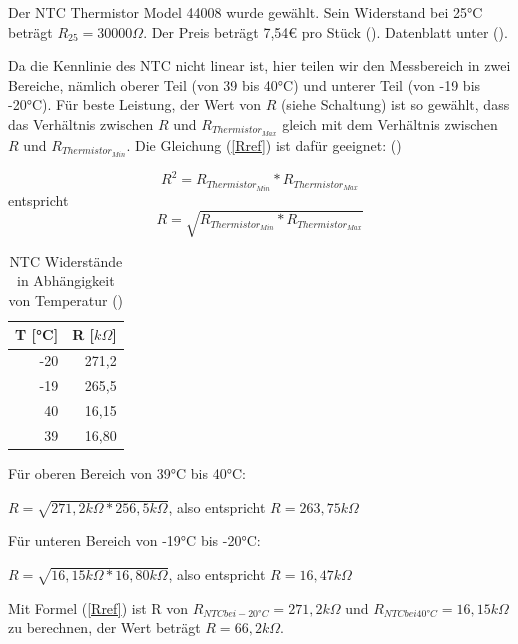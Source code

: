 \documentclass[12pt]{article}
\begin{document}
Der NTC Thermistor Model 44008 wurde gewählt. Sein Widerstand bei 25°C beträgt $R_{25} = 30000\Omega$. Der Preis beträgt 7,54€ pro Stück (\cite{TEConnectivity.2021c}). Datenblatt unter (\cite{TEConnectivity.2016}).

Da die Kennlinie des NTC nicht linear ist, hier teilen wir den Messbereich in zwei Bereiche, nämlich oberer Teil (von 39 bis 40°C) und unterer Teil (von -19 bis -20°C). Für beste Leistung, der Wert von $R$ (siehe Schaltung) ist so gewählt, dass das Verhältnis zwischen $R$ und $R_{Thermistor_{Max}}$ gleich mit dem Verhältnis zwischen $R$ und $R_{Thermistor_{Min}}$. Die Gleichung (\ref{Rref}) ist dafür geeignet: (\cite{TexasInstruments.2018})

\begin{equation}
  R^2 = R_{Thermistor_{Min}} * R_{Thermistor_{Max}}
\end{equation}
entspricht
\begin{equation}\label{Rref}
  R = \sqrt{R_{Thermistor_{Min}} * R_{Thermistor_{Max}}}
\end{equation}


\begin{table}[h]
  \caption{\normalsize{NTC Widerstände in Abhängigkeit von Temperatur (\cite{TEConnectivity.2016})}}
  \begin{center}
    \begin{tabular}{r|r}
    T [°C] & R [$k\Omega$] \\
    \hline
    -20 & 271,2 \\
    -19 & 265,5 \\
    40 & 16,15 \\
    39 & 16,80 \\
    \end{tabular} 
  \end{center}
\end{table}

Für oberen Bereich von 39°C bis 40°C: 
\begin{center}
$R = \sqrt{271,2k\Omega * 256,5k\Omega}$, also entspricht $R = 263,75k\Omega$
\end{center}

Für unteren Bereich von -19°C bis -20°C: 
\begin{center}
$R = \sqrt{16,15k\Omega * 16,80k\Omega}$, also entspricht $R = 16,47k\Omega$
\end{center}

Mit Formel (\ref{Rref}) ist R von $R_{NTC bei -20°C} = 271,2k\Omega$ und $R_{NTC bei 40°C} = 16,15k\Omega$ zu berechnen, der Wert beträgt $R = 66,2k\Omega$.
\end{document}
